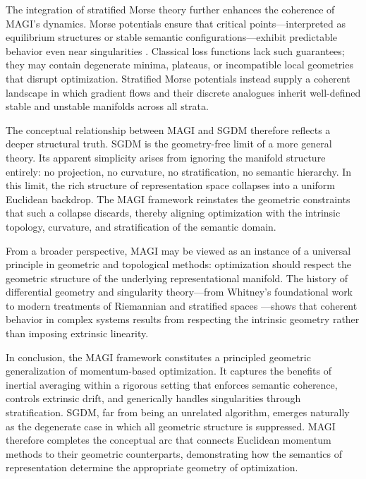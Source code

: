 \documentclass[12pt]{article}
\begin{document}
The integration of stratified Morse theory further enhances the coherence of MAGI’s dynamics. Morse potentials ensure that critical points—interpreted as equilibrium structures or stable semantic configurations—exhibit predictable behavior even near singularities \citep{Milnor1963,GoreskyMacPherson1988}. Classical loss functions lack such guarantees; they may contain degenerate minima, plateaus, or incompatible local geometries that disrupt optimization. Stratified Morse potentials instead supply a coherent landscape in which gradient flows and their discrete analogues inherit well-defined stable and unstable manifolds across all strata.

The conceptual relationship between MAGI and SGDM therefore reflects a deeper structural truth. SGDM is the geometry-free limit of a more general theory. Its apparent simplicity arises from ignoring the manifold structure entirely: no projection, no curvature, no stratification, no semantic hierarchy. In this limit, the rich structure of representation space collapses into a uniform Euclidean backdrop. The MAGI framework reinstates the geometric constraints that such a collapse discards, thereby aligning optimization with the intrinsic topology, curvature, and stratification of the semantic domain.

From a broader perspective, MAGI may be viewed as an instance of a universal principle in geometric and topological methods: optimization should respect the geometric structure of the underlying representational manifold. The history of differential geometry and singularity theory—from Whitney’s foundational work \citep{Whitney1965} to modern treatments of Riemannian and stratified spaces \citep{LeeRiemannian2018,Pflaum2000,Boumal2023}—shows that coherent behavior in complex systems results from respecting the intrinsic geometry rather than imposing extrinsic linearity.

In conclusion, the MAGI framework constitutes a principled geometric generalization of momentum-based optimization. It captures the benefits of inertial averaging within a rigorous setting that enforces semantic coherence, controls extrinsic drift, and generically handles singularities through stratification. SGDM, far from being an unrelated algorithm, emerges naturally as the degenerate case in which all geometric structure is suppressed. MAGI therefore completes the conceptual arc that connects Euclidean momentum methods to their geometric counterparts, demonstrating how the semantics of representation determine the appropriate geometry of optimization.


\printbibliography
\end{document}
